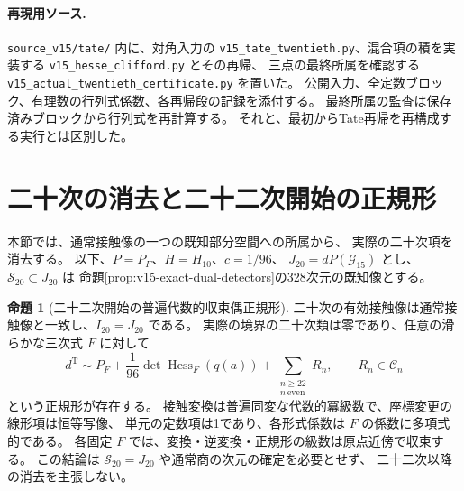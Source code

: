 \documentclass[a4paper,11pt]{ltjsarticle}
\theoremstyle{definition}
\newtheorem{theorem}{命題}[section]
\begin{document}
\paragraph{再現用ソース.}
\texttt{source\_v15/tate/} 内に、対角入力の
\nolinkurl{v15_tate_twentieth.py}、混合項の積を実装する
\nolinkurl{v15_hesse_clifford.py} とその再帰、
三点の最終所属を確認する
\nolinkurl{v15_actual_twentieth_certificate.py} を置いた。
公開入力、全定数ブロック、有理数の行列式係数、各再帰段の記録を添付する。
最終所属の監査は保存済みブロックから行列式を再計算する。
それと、最初からTate再帰を再構成する実行とは区別した。




\section{二十次の消去と二十二次開始の正規形}
\label{sec:v15-twenty-second}

本節では、通常接触像の一つの既知部分空間への所属から、
実際の二十次項を消去する。
以下、$P=P_F$、$H=H_{10}$、$c=1/96$、
$J_{20}=dP(\mathcal G_{15})$ とし、
$\mathcal S_{20}\subset J_{20}$ は
命題\ref{prop:v15-exact-dual-detectors}の328次元の既知像とする。

\begin{theorem}[二十二次開始の普遍代数的収束偶正規形]
\label{thm:v15-twenty-second-normal-form}
二十次の有効接触像は通常接触像と一致し、$I_{20}=J_{20}$ である。
実際の境界の二十次類は零であり、任意の滑らかな三次式 $F$ に対して
\begin{equation}\label{eq:v15-twenty-second-normal-form}
 \boxed{\displaystyle
 d^{\mathrm T}\sim
 P_F+\frac1{96}\det\operatorname{Hess}_F(q(a))
       +\sum_{\substack{n\ge22\\ n\ \mathrm{even}}}R_n,
 \qquad R_n\in\mathcal C_n
 }
\end{equation}
という正規形が存在する。
接触変換は普遍同変な代数的冪級数で、座標変更の線形項は恒等写像、
単元の定数項は1であり、各形式係数は $F$ の係数に多項式的である。
各固定 $F$ では、変換・逆変換・正規形の級数は原点近傍で収束する。
この結論は $\mathcal S_{20}=J_{20}$ や通常商の次元の確定を必要とせず、
二十二次以降の消去を主張しない。
\end{theorem}
\end{document}

